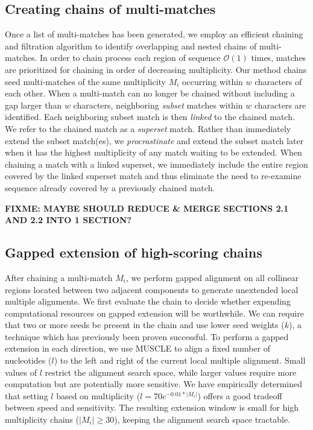 \documentclass{llncs}
\begin{document}
\subsection{Creating chains of multi-matches}
Once a list of multi-matches has been generated, we employ an
efficient chaining and filtration algorithm to identify overlapping
and nested chains of multi-matches\cite{ref-procrast}. In order to
chain process each region of sequence $\mathcal{O}(1)$ times, matches
are prioritized for chaining in order of decreasing multiplicity.  Our
method chains seed multi-matches of the same multiplicity $M_{i}$
occurring within $w$ characters of each other.  When a multi-match can
no longer be chained without including a gap larger than $w$
characters, neighboring \textit{subset} matches within $w$ characters
are identified. Each neighboring subset match is then \textit{linked}
to the chained match. We refer to the chained match as a
\textit{superset} match. Rather than immediately extend the subset
match(es), we \textit{procrastinate} and extend the subset match later
when it has the highest multiplicity of any match waiting to be
extended. When chaining a match with a linked superset, we immediately
include the entire region covered by the linked superset match and
thus eliminate the need to re-examine sequence already covered by a
previously chained match.

\textbf{FIXME: MAYBE SHOULD REDUCE \& MERGE SECTIONS 2.1 AND 2.2 INTO 1 SECTION?}

\subsection{Gapped extension of high-scoring chains}

After chaining a multi-match $M_i$, we perform gapped alignment on all
collinear regions located between two adjacent components to generate
unextended local multiple alignments. We first evaluate the chain to
decide whether expending computational resources on gapped extension
will be worthwhile. We can require that two or more seeds be present
in the chain and use lower seed weights ($k$), a technique which has
previously been proven
successful\cite{ref-blastz,ref-gappedblast,ref-blat}.  To perform a
gapped extension in each direction, we use MUSCLE to align a fixed
number of nucleotides ($l$) to the left and right of the current local
multiple alignment.  Small values of $l$ restrict the alignment search
space, while larger values require more computation but are
potentially more sensitive.  We have empirically determined that
setting $l$ based on multiplicity ($l = 70e^{-0.01*|M_{i}|}$) offers a
good tradeoff between speed and sensitivity.  The resulting extension
window is small for high multiplicity chains ($|M_{i}|\geq 30$),
keeping the alignment search space tractable.
\end{document}
